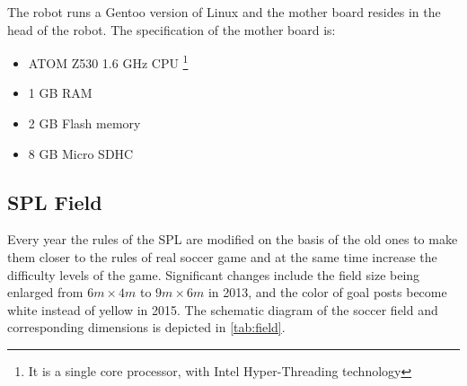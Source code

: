 The robot runs a Gentoo version of Linux and the mother board resides in the head of the robot. The specification of the mother board is:
\begin{itemize}
  \item ATOM Z530 1.6 GHz CPU \footnote{It is a single core processor, with Intel Hyper-Threading technology}
  \item 1 GB RAM
  \item 2 GB Flash memory
\item 8 GB Micro SDHC
\end{itemize}

\subsection[Standard Platform League Field]{\gls{SPL} Field}
Every year the rules of the \gls{SPL} are modified on the basis of the old ones to make them closer to the rules of real soccer game and at the same time increase the difficulty levels of the game. Significant changes include the field size being enlarged from $6m \times 4m$ to $9m \times 6m$ in 2013, and the color of goal posts become white instead of yellow in 2015. The schematic diagram of the soccer field and corresponding dimensions is depicted in \autoref{tab:field}.


